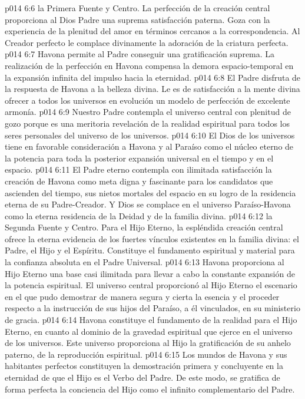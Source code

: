\vs p014 6:6  la Primera Fuente y Centro. La perfección de la creación central proporciona al Dios Padre una suprema satisfacción paterna. Goza con la experiencia de la plenitud del amor en términos cercanos a la correspondencia. Al Creador perfecto le complace divinamente la adoración de la criatura perfecta.
\vs p014 6:7 Havona permite al Padre conseguir una gratificación suprema. La realización de la perfección en Havona compensa la demora espacio\hyp{}temporal en la expansión infinita del impulso hacia la eternidad.
\vs p014 6:8 El Padre disfruta de la respuesta de Havona a la belleza divina. Le es de satisfacción a la mente divina ofrecer a todos los universos en evolución un modelo de perfección de excelente armonía.
\vs p014 6:9 Nuestro Padre contempla el universo central con plenitud de gozo porque es una meritoria revelación de la realidad espiritual para todos los seres personales del universo de los universos.
\vs p014 6:10 El Dios de los universos tiene en favorable consideración a Havona y al Paraíso como el núcleo eterno de la potencia para toda la posterior expansión universal en el tiempo y en el espacio.
\vs p014 6:11 El Padre eterno contempla con ilimitada satisfacción la creación de Havona como meta digna y fascinante para los candidatos que ascienden del tiempo, sus nietos mortales del espacio en su logro de la residencia eterna de su Padre\hyp{}Creador. Y Dios se complace en el universo Paraíso\hyp{}Havona como la eterna residencia de la Deidad y de la familia divina.
\vs p014 6:12  la Segunda Fuente y Centro. Para el Hijo Eterno, la espléndida creación central ofrece la eterna evidencia de los fuertes vínculos existentes en la familia divina: el Padre, el Hijo y el Espíritu. Constituye el fundamento espiritual y material para la confianza absoluta en el Padre Universal.
\vs p014 6:13 Havona proporciona al Hijo Eterno una base casi ilimitada para llevar a cabo la constante expansión de la potencia espiritual. El universo central proporcionó al Hijo Eterno el escenario en el que pudo demostrar de manera segura y cierta la esencia y el proceder respecto a la instrucción de sus hijos del Paraíso, a él vinculados, en su ministerio de gracia.
\vs p014 6:14 Havona constituye el fundamento de la realidad para el Hijo Eterno, en cuanto al dominio de la gravedad espiritual que ejerce en el universo de los universos. Este universo proporciona al Hijo la gratificación de su anhelo paterno, de la reproducción espiritual.
\vs p014 6:15 Los mundos de Havona y sus habitantes perfectos constituyen la demostración primera y concluyente en la eternidad de que el Hijo es el Verbo del Padre. De este modo, se gratifica de forma perfecta la conciencia del Hijo como el infinito complementario del Padre.
